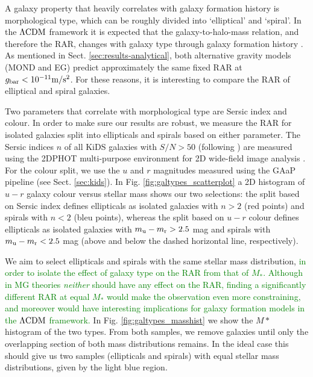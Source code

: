 \documentclass[usenatbib]{mnras}
\newcommand{\mpss}{ {\rm m/s^2} }
\newcommand{\lcdm}{{\rm \Lambda CDM}}
\newcommand{\un}[1]{_{\rm #1}}
\begin{document}
A galaxy property that heavily correlates with galaxy formation history is morphological type, which can be roughly divided into `elliptical' and `spiral'. In the $\lcdm$ framework it is expected that the galaxy-to-halo-mass relation, and therefore the RAR, changes with galaxy type through galaxy formation history \cite[]{dutton2010,matthee2017,posti2019,marasco2020}. As mentioned in Sect. \ref{sec:results-analytical}, both alternative gravity models (MOND and EG) predict approximately the same fixed RAR at $g\un{bar}<10^{-11} \mpss$.  For these reasons, it is interesting to compare the RAR of elliptical and spiral galaxies.

Two parameters that correlate with morphological type are Sersic index and colour. In order to make sure our results are robust, we measure the RAR for isolated galaxies split into ellipticals and spirals based on either parameter. The Sersic indices $n$ of all KiDS galaxies with $S/N > 50$ (following \cite{roy2018}) are measured using the \textsc{2DPHOT} multi-purpose environment for 2D wide-field image analysis \cite[]{barbera2008}. For the colour split, we use the $u$ and $r$ magnitudes measured using the GAaP pipeline (see Sect. \ref{sec:kids}). In Fig. \ref{fig:galtypes_scatterplot} a 2D histogram of $u-r$ galaxy colour versus stellar mass shows our two selections: the split based on Sersic index defines ellipticals as isolated galaxies with $n > 2$ (red points) and spirals with $n<2$ (bleu points), whereas the split based on $u-r$ colour defines ellipticals as isolated galaxies with $m\un{u} - m\un{r} > 2.5$ mag and spirals with $m\un{u} - m\un{r} < 2.5$ mag (above and below the dashed horizontal line, respectively).

We aim to select ellipticals and spirals with the same stellar mass distribution, \textcolor{Green}{in order to isolate the effect of galaxy type on the RAR from that of $M_*$. Although in MG theories \emph{neither} should have any effect on the RAR, finding a significantly different RAR at equal $M_*$ would make the observation even more constraining, and moreover would have interesting implications for galaxy formation models in the $\lcdm$ framework.} In Fig. \ref{fig:galtypes_masshist} we show the $M*$ histogram of the two types. From both samples, we remove galaxies until only the overlapping section of both mass distributions remains. In the ideal case this should give us two samples (ellipticals and spirals) with equal stellar mass distributions, given by the light blue region.
\end{document}
